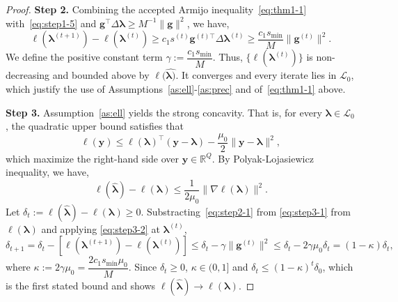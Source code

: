 \begin{proof}
    \noindent\textbf{Step 2.} Combining the accepted Armijo inequality~\eqref{eq:thm1-1} with~\eqref{eq:step1-5} and $\mathbf{g}^{\top}\Delta\bm{\lambda}\geq M^{-1}\|\mathbf{g}\|^{2}$, we have,
    \begin{equation}
        \ell(\bm{\lambda}^{(t+1)})-\ell(\bm{\lambda}^{(t)})\geq c_{1}s^{(t)}\mathbf{g}^{(t)\top}\Delta \bm{\lambda}^{(t)} \geq \frac{c_{1}s_{\min}}{M}\|\mathbf{g}^{(t)}\|^{2}.
        \label{eq:step2-1}
    \end{equation}
    We define the positive constant term $\gamma:=\dfrac{c_{1}s_{\min}}{M}$. Thus, $\{\ell(\bm{\lambda}^{(t)})\}$ is non-decreasing and bounded above by $\ell{(\hat{\bm{\lambda})}}$. It converges and every iterate lies in $\mathcal{L}_{0}$, which justify the use of Assumptions~\ref{as:ell}-\ref{as:prec} and of~\eqref{eq:thm1-1} above.
    \medskip

    \noindent\textbf{Step 3.} Assumption~\ref{as:ell} yields the strong concavity. That is, for every $\bm{\lambda}\in\mathcal{L}_{0}$, the quadratic upper bound satisfies that
    \begin{equation}
        \ell(\bm{y})\leq \ell(\bm{\lambda})^{\top}(\bm{y}-\bm{\lambda})-\frac{\mu_{0}}{2}\|\bm{y}-\bm{\lambda}\|^{2},
        \label{eq:step3-1}
    \end{equation}
    which maximize the right-hand side over $\bm{y}\in\mathbb{R}^{Q}$. By Polyak-Lojasiewicz inequality, we have,
    \begin{equation}
        \ell(\hat{\bm{\lambda}})-\ell(\bm{\lambda})\leq \frac{1}{2\mu_{0}}\|\nabla\ell(\bm{\lambda})\|^{2}.
        \label{eq:step3-2}
    \end{equation}
    Let $\delta_{t}:=\ell(\hat{\bm{\lambda}})-\ell(\bm{\lambda})\geq 0$. Substracting~\eqref{eq:step2-1} from \eqref{eq:step3-1} from $\ell(\bm{\lambda})$ and applying \eqref{eq:step3-2} at $\bm{\lambda}^{(t)}$,
    \begin{equation}
        \delta_{t+1}=\delta_{t}-\left[\ell(\bm{\lambda}^{(t+1)})-\ell(\bm{\lambda}^{(t)})\right]\leq \delta_{t}-\gamma \|\mathbf{g}^{(t)}\|^{2}\leq \delta_{t}-2\gamma \mu_{0} \delta_{t}=(1-\kappa)\delta_{t},
        \label{eq:step3-3}
    \end{equation}
    where $\kappa:=2\gamma\mu_{0}=\dfrac{2c_{1}s_{\min}\mu_{0}}{M}$. Since $\delta_{t}\geq0$, $\kappa\in(0,1]$ and $\delta_{t}\leq (1-\kappa)^{t}\delta_{0}$, which is the first stated bound and shows $\ell(\hat{\bm{\lambda}})\to\ell(\bm{\lambda})$.
    \medskip


\end{proof}
